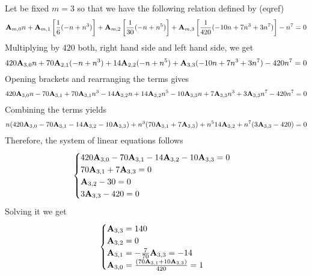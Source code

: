 \begin{examp}
    Let be fixed $m=3$ so that we have the following relation defined by (eqref)
    \begin{equation*}
        {\mathbf{A}} \sb{m,0} n
        + {\mathbf{A}} \sb{m,1} \left[ \frac{1}{6} (-n + n^3) \right]
        + {\mathbf{A}} \sb{m,2} \left[ \frac{1}{30} (-n + n^5) \right]
        + {\mathbf{A}} \sb{m,3} \left[ \frac{1}{420} (-10 n + 7 n^3 + 3 n^7) \right] - n^7 = 0
    \end{equation*}
    Multiplying by $420$ both, right hand side and left hand side, we get
    \begin{equation*}
        420 {\mathbf{A}} \sb{3,0} n + 70 {\mathbf{A}} \sb{2,1} (-n + n^3) + 14 {\mathbf{A}} \sb{2,2} (-n + n^5) + {\mathbf{A}} \sb{3,3} (-10 n + 7 n^3 + 3 n^7) - 420n^7 = 0
    \end{equation*}
    Opening brackets and rearranging the terms gives
    \begin{equation*}
        \begin{split}
            420 {\mathbf{A}} \sb{3,0} n - 70 {\mathbf{A}} \sb{3,1} + 70 {\mathbf{A}} \sb{3,1} n^3 - 14 {\mathbf{A}} \sb{3,2} n + 14 {\mathbf{A}} \sb{3,2} n^5
            - 10 {\mathbf{A}} \sb{3,3} n + 7 {\mathbf{A}} \sb{3,3} n^3 + 3 {\mathbf{A}} \sb{3,3} n^7 - 420n^7 = 0
        \end{split}
    \end{equation*}
    Combining the terms yields
    \begin{equation*}
        \begin{split}
            n (420 {\mathbf{A}} \sb{3,0} - 70 {\mathbf{A}} \sb{3,1} - 14 {\mathbf{A}} \sb{3,2} - 10 {\mathbf{A}} \sb{3,3})
            + n^3 (70 {\mathbf{A}} \sb{3,1} + 7 {\mathbf{A}} \sb{3,3})
            + n^5 14 {\mathbf{A}} \sb{3,2}
            + n^7 (3 {\mathbf{A}} \sb{3,3} - 420)
            = 0
        \end{split}
    \end{equation*}
    Therefore, the system of linear equations follows
    \begin{equation*}
        \begin{cases}
            420 {\mathbf{A}} \sb{3,0} - 70 {\mathbf{A}} \sb{3,1} - 14 {\mathbf{A}} \sb{3,2} - 10 {\mathbf{A}} \sb{3,3} = 0 \\
            70 {\mathbf{A}} \sb{3,1} + 7 {\mathbf{A}} \sb{3,3} = 0 \\
            {\mathbf{A}} \sb{3,2} - 30 = 0 \\
            3 {\mathbf{A}} \sb{3,3} - 420 = 0
        \end{cases}
    \end{equation*}
    Solving it we get
    \begin{equation*}
        \begin{cases}
            {\mathbf{A}} \sb{3,3} = 140 \\
            {\mathbf{A}} \sb{3,2} = 0 \\
            {\mathbf{A}} \sb{3,1} = -\frac{7}{70} {\mathbf{A}} \sb{3,3} = -14 \\
            {\mathbf{A}} \sb{3,0} = \frac{(70 {\mathbf{A}} \sb{3,1} + 10 {\mathbf{A}} \sb{3,3})}{420} = 1
        \end{cases}
    \end{equation*}
\end{examp}